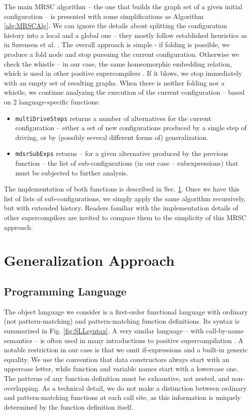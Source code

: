 \documentclass[submission,copyright,creativecommons]{eptcs}
\begin{document}
The main MRSC algorithm -- the one that builds the graph set of a given initial
configuration -- is presented with some simplifications as Algorithm \ref{alg:MRSCAlg}.
We can ignore the details about splitting the configuration history into a local
and a global one -- they mostly follow established heuristics as in S{\o}rensen et al. 
\cite{Sorensen1994TurchinSupercompiler,sorm98b}.
The overall approach is simple - if folding is possible, we produce a fold node 
and stop pursuing the current configuration.
Otherwise we check the whistle -- in our case, the same homeomorphic embedding relation,
which is used in other positive supercompilers \cite{sorm98b}.
If it blows, we stop immediately with an empty set of resulting graphs.
When there is neither folding nor a whistle, we continue analyzing the execution of the
current configuration -- based on 2 language-specific functions:
\begin{itemize}
  \item \verb|multiDriveSteps| returns a number of alternatives for the current configuration --
    either a set of new configurations produced by a single step of driving, 
    or by (possibly several different forms of) generalization.
  \item \verb|mdsrSubExps| returns -- for a given alternative produced by the previous function --
    the list of sub-configurations (in our case -- subexpressions) that must be subjected
    to further analysis.
\end{itemize}
The implementation of both functions is described in Sec. \ref{sec:Generalize}.
Once we have this list of lists of sub-configurations, we simply apply the same
algorithm recursively, but with extended history.
Readers familiar with the implementation details of other supercompilers are
invited to compare them to the simplicity of this MRSC approach.

\section{Generalization Approach}\label{sec:Generalize}

\subsection{Programming Language}

The object language we consider is a first-order functional language with ordinary (not pattern-matching) and 
pattern-matching function definitions.
Its syntax is summarized in Fig. \ref{fig:SLLsyntax}.
A very similar language -- with call-by-name semantics -- is often used in many introductions to positive
supercompilation \cite{Sorensen1994TurchinSupercompiler,sorm98b,TMR/SCP2014}.
A notable restriction in our case is that we omit if-expressions and a built-in generic equality.
We use the convention that data constructors always start with an uppercase letter, while
function and variable names start with a lowercase one.
The patterns of any function definition must be exhaustive, not nested, and non-overlapping.
As a technical detail, we do not make a distinction between ordinary and pattern-matching functions
at each call site, as this information is uniquely determined by the function definition itself.
\end{document}
